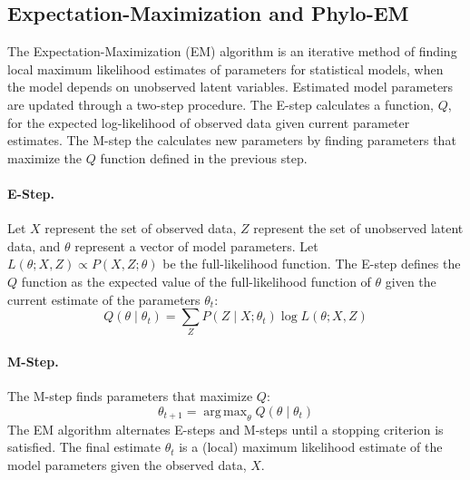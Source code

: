 \subsection{Expectation-Maximization and Phylo-EM}
The Expectation-Maximization (EM) algorithm is an iterative method of finding local maximum likelihood estimates of parameters for statistical models, when the model depends on unobserved latent variables. Estimated model parameters are updated through a two-step procedure. The E-step calculates a function, $Q$, for the expected log-likelihood of observed data given current parameter estimates. The M-step the calculates new parameters by finding parameters that maximize the $Q$ function defined in the previous step.
\paragraph{E-Step.}
Let $X$ represent the set of observed data, $Z$ represent the set of unobserved latent data, and $\theta$ represent a vector of model parameters. Let $L(\theta; X, Z) \propto P(X, Z ; \theta)$ be the full-likelihood function. The E-step defines the $Q$ function as the expected value of the full-likelihood function of $\theta$ given the current estimate of the parameters $\theta_t$:
%
\begin{equation}
    Q\left(\theta \middle| \theta_t \right) =
    \sum_Z P\left(Z \middle| X ; \theta_t\right) \log L\left(\theta ; X, Z\right)
\end{equation}
%
\paragraph{M-Step.}
The M-step finds parameters that maximize $Q$:
%
\begin{equation}
    \theta_{t+1} = \mathop{\mathrm{arg\,max}}_\theta  Q\left(\theta \middle| \theta_t \right)
\end{equation}
%
The EM algorithm alternates E-steps and M-steps until a stopping criterion is satisfied. The final estimate $\theta_t$ is a (local) maximum likelihood estimate of the model parameters given the observed data, $X$.


